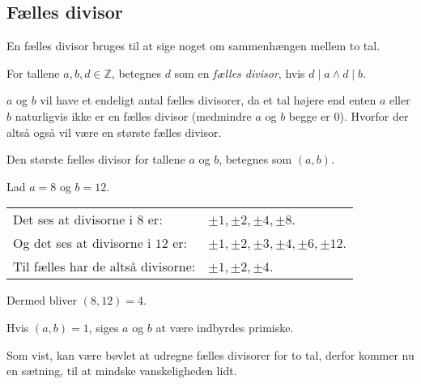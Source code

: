 

\subsection{Fælles divisor}
En fælles divisor bruges til at sige noget om sammenhængen mellem to tal.

\begin{definition}
    For tallene \(a, b, d \in \mathbb{Z}\), betegnes \(d\) som en \emph{fælles divisor}, hvis \(d \mid a \land d \mid b\).
\end{definition}

\(a\) og \(b\) vil have et endeligt antal fælles divisorer, da et tal højere end enten \(a\) eller \(b\) naturligvis ikke er en fælles divisor (medmindre \(a\) og \(b\) begge er \(0\)).
Hvorfor der altså også vil være en største fælles divisor.

\begin{definition}
    Den største fælles divisor for tallene \(a\) og \(b\), betegnes som \((a, b)\).
\end{definition}

\begin{eks}
    Lad \(a = 8\) og \(b = 12\).\\
    \begin{tabular*}{\textwidth}{@{} l l}
        Det ses at divisorne i \(8\) er:      & \(\pm 1, \pm 2, \pm 4, \pm 8\).\\
        Og det ses at divisorne i \(12\) er:  &\(\pm 1, \pm 2, \pm 3, \pm 4, \pm 6, \pm 12\).\\
        Til fælles har de altså divisorne:    & \(\pm 1, \pm 2, \pm 4\).
    \end{tabular*}
    Dermed bliver \((8, 12) = 4\).
\end{eks}


\begin{definition}
    Hvis \((a, b) = 1\), siges \(a\) og \(b\) at være indbyrdes primiske.
\end{definition}

Som vist, kan være bøvlet at udregne fælles divisorer for to tal, derfor kommer nu en sætning, til at mindske vanskeligheden lidt.

